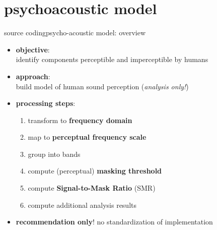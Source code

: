 	\section[psycho]{psychoacoustic model}
	\begin{frame}{source coding}{psycho-acoustic model: overview}
        \begin{itemize}
            \item   \textbf{objective}:\\ identify components perceptible and imperceptible by humans
            \pause
            \smallskip
            \item   \textbf{approach}:\\ build model of human sound perception (\textit{analysis only!})
            \pause
            \smallskip
            \item   \textbf{processing steps}:
                \begin{enumerate}
                    \item	transform to \textbf{frequency domain}
                    \pause
                    \item	map to \textbf{perceptual frequency scale}
                    \pause
                    \item   group into bands
                    \pause
                    \item	compute (perceptual) \textbf{masking threshold}
                    \pause
                    \item	compute \textbf{Signal-to-Mask Ratio} (SMR)
                    \pause
                    \item   compute additional analysis results
                \end{enumerate}
            \pause
            \smallskip
            \item   \textbf{recommendation only}! no standardization of implementation
        \end{itemize}
	\end{frame}
	
